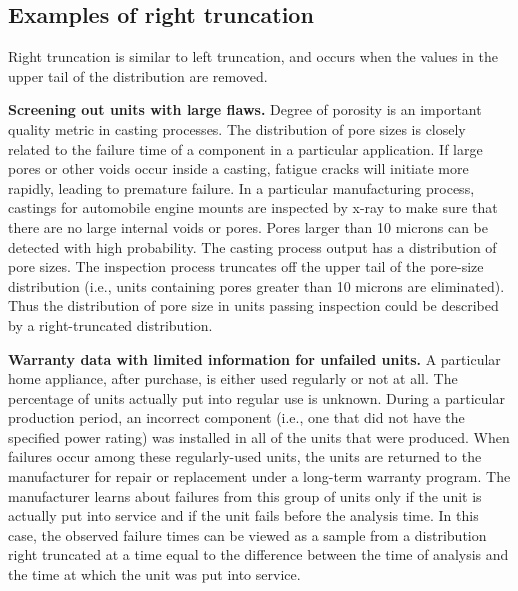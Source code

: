 \subsection{Examples of right truncation}
Right truncation is similar to left truncation, and occurs when the
values in the upper tail of the distribution are removed. 
 
\begin{example}
\label{example:Inspection of castings to improve reliability.}
{\bf Screening out units with large flaws.} Degree of porosity is an
important quality metric in casting processes. The distribution of
pore sizes is closely related to the failure time of a component
in a particular application. If large pores or other voids occur
inside a casting, fatigue cracks will initiate more rapidly, leading
to premature failure.  In a particular manufacturing process, castings
for automobile engine mounts are inspected by x-ray to make sure that
there are no large internal voids or pores.  Pores larger than 10
microns can be detected with high probability. The casting process 
output has a
distribution of pore sizes. The inspection process truncates off the
upper tail of the pore-size distribution (i.e., units containing
pores greater than 10 microns are eliminated). Thus the distribution of
pore size in units passing inspection could be described by a
right-truncated distribution.
\end{example}


\begin{example}
\label{example:warranty.and.right.trun}
{\bf Warranty data with limited information for unfailed units.} A
particular home appliance, after purchase, is either used regularly or
not at all. The percentage of units actually put into regular use is
unknown. During a particular production period, an incorrect component
(i.e., one that did not have the specified power rating) was installed
in all of the units that were produced. When failures occur among
these regularly-used units, the units are returned to the manufacturer
for repair or replacement under a long-term warranty program. The manufacturer
learns about failures from this group of units only if the unit is
actually put into service and if the unit fails before the analysis
time.  In this case, the observed failure times can be viewed as a
sample from a distribution right truncated at a time equal to the difference
between the time of analysis and the time at which the unit was put
into service.
\end{example}


